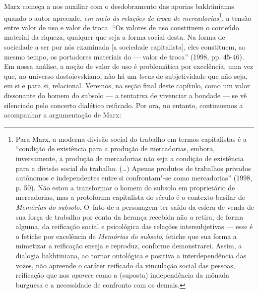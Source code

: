 Marx começa a nos auxiliar com o desdobramento das aporias bakhtinianas
quando o autor apreende, \emph{em meio às relações de troca de
mercadorias}\footnote{Para Marx, a moderna divisão social do trabalho em
  termos capitalistas é a ``condição de existência para a produção de
  mercadorias, embora, inversamente, a produção de mercadorias não seja
  a condição de existência para a divisão social do trabalho. (\ldots)
  Apenas produtos de trabalhos privados autônomos e independentes entre
  si confrontam"-se como mercadorias'' (1998, p. 50). Não estou a
  transformar o homem do subsolo em proprietário de mercadorias, mas a
  protoforma capitalista do século  é o contexto basilar de
  \emph{Memórias do subsolo.} O~fato de a personagem ter saído da esfera
  de venda de sua força de trabalho por conta da herança recebida não a
  retira, de forma alguma, da reificação social e psicológica das
  relações intersubjetivas --- esse é o fetiche por excelência de
  \emph{Memórias do subsolo}, fetiche que sua forma a mimetizar a
  reificação enseja e reproduz, conforme demonstrarei. Assim, a dialogia
  bakhtiniana, ao tornar ontológica e positiva a interdependência das
  vozes, não apreende o caráter reificado da vinculação social das
  pessoas, reificação que nos \emph{aparece} como a (suposta)
  independência da mônada burguesa e a necessidade de confronto com os
  demais.}, a tensão entre valor de uso e valor de troca. ``Os valores
de uso constituem o conteúdo material da riqueza, qualquer que seja a
forma social desta. Na forma de sociedade a ser por nós examinada {[}a
sociedade capitalista{]}, eles constituem, ao mesmo tempo, os portadores
materiais do --- valor de troca'' (1998, pp. 45-46). Em nossa análise, a
noção de valor de uso é problemática por excelência, uma vez que, no
universo dostoievskiano, não há um \emph{locus} de subjetividade que não
seja, em si e para si, relacional. Veremos, na seção final deste
capítulo, como um valor dissonante do homem do subsolo --- a tentativa de
vivenciar a bondade --- se vê silenciado pelo concerto dialético
reificado. Por ora, no entanto, continuemos a acompanhar a argumentação
de Marx:

